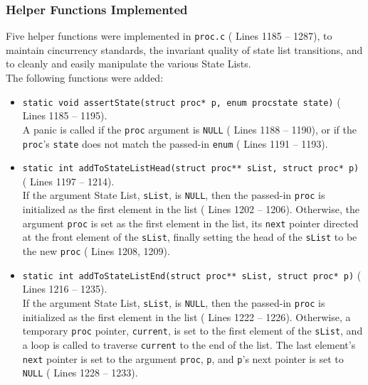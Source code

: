 \documentclass[11pt,letterpaper]{report}
\begin{document}
 	\subsubsection{Helper Functions Implemented}
 	
 	Five helper functions were implemented in {\tt proc.c} ({\color{red} Lines 1185 -- 1287}), to maintain cincurrency standards, the invariant quality of state list transitions, and to cleanly and easily manipulate the various State Lists.\\
 	The following functions were added:
 	\begin{itemize}
 		\item {\tt static void assertState(struct proc* p, enum procstate state)} ({\color{red} Lines 1185 -- 1195}).\\
 		A panic is called if the {\tt proc} argument is {\tt NULL} ({\color{red} Lines 1188 -- 1190}), or if the {\tt proc}'s {\tt state} does not match the passed-in {\tt enum} ({\color{red} Lines 1191 -- 1193}).
 		
 		\item {\tt static int addToStateListHead(struct proc** sList, struct proc* p)} ({\color{red} Lines 1197 -- 1214}).\\
 		If the argument State List, {\tt sList}, is {\tt NULL}, then the passed-in {\tt proc} is initialized as the first element in the list ({\color{red} Lines 1202 -- 1206}). Otherwise, the argument {\tt proc} is set as the first element in the list, its {\tt next} pointer directed at the front element of the {\tt sList}, finally setting the head of the {\tt sList} to be the new {\tt proc} ({\color{red} Lines 1208, 1209}).
 		
 		\item {\tt static int addToStateListEnd(struct proc** sList, struct proc* p)} ({\color{red} Lines 1216 -- 1235}).\\
 		If the argument State List, {\tt sList}, is {\tt NULL}, then the passed-in {\tt proc} is initialized as the first element in the list ({\color{red} Lines 1222 -- 1226}). Otherwise, a temporary {\tt proc} pointer, {\tt current}, is set to the first element of the {\tt sList}, and a loop is called to traverse {\tt current} to the end of the list. The last element's {\tt next} pointer is set to the argument {\tt proc}, {\tt p}, and {\tt p}'s next pointer is set to {\tt NULL} ({\color{red} Lines 1228 -- 1233}). 
 		

\end{itemize}
\end{document}
